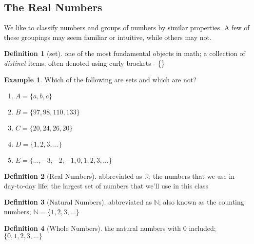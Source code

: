 \documentclass[addpoints,12pt]{exam}
\theoremstyle{definition}
\newtheorem{example}{Example}[subsection]
\newtheorem{definition}{Definition}[subsection]
\begin{document}
\setcounter{section}{1}
\setcounter{subsection}{2}

\subsection{The Real Numbers}
\noindent We like to classify numbers and groups of numbers by similar properties. A few of these groupings may seem familiar or intuitive, while others may not.

\vspace{.25in}

\begin{definition}[set]
one of the most fundamental objects in math; a collection of \emph{distinct} items; often denoted using curly brackets - \{\}
\end{definition}

\vspace{.25in}

\begin{example}
Which of the following are sets and which are not?
\begin{enumerate}
\item $A = \{a,b,c\}$
\item $B = \{97, 98, 110, 133\}$
\item $C = \{20, 24, 26, 20\}$
\item $D = \{1, 2, 3, \dots\}$
\item $E = \{\dots,-3,-2,-1,0,1,2,3,\dots\}$
\end{enumerate}
\end{example}

\vspace{.25in}

\begin{definition}[Real Numbers]
abbreviated as $\mathbb{R}$; the numbers that we use in day-to-day life; the largest set of numbers that we'll use in this class
\end{definition}
\vspace{.25in}

\begin{definition}[Natural Numbers]
abbreviated as $\mathbb{N}$; also known as the counting numbers; $\mathbb{N} = \{1,2,3,\dots\}$
\end{definition}
\vspace{.25in}

\begin{definition}[Whole Numbers]
the natural numbers with 0 included;\\ $\{0,1,2,3,\dots\}$
\end{definition}
\vspace{.25in}
\end{document}
